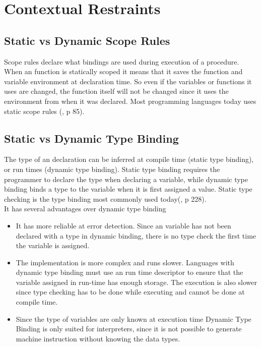 \section{Contextual Restraints}
\subsection{Static vs Dynamic Scope Rules}
Scope rules declare what bindings are used during execution of a procedure.
When an function is statically scoped it means that it saves the function and variable environment at declaration time. So even if the variables or functions it uses are changed, the function itself will not be changed since it uses the environment from when it was declared. Most programming languages today uses static scope rules (\cite{syntax-and-semantics}, p 85). 
\subsection{Static vs Dynamic Type Binding}
The type of an declaration can be inferred at compile time (static type binding), or run times (dynamic type binding). Static type binding requires the programmer to declare the type when declaring a variable, while dynamic type binding binds a type to the variable when it is first assigned a value. Static type checking is the type binding most commonly used today(\cite{conceptsOfProgrammingLanguages}, p 228). \\ 
It has several advantages over dynamic type binding
\begin{itemize}
    \item It has more reliable at error detection. Since an variable has not been declared with a type in dynamic binding, there is no type check the first time the variable is assigned.
    \item The implementation is more complex and runs slower. Languages with dynamic type binding must use an run time descriptor to ensure that the variable assigned in run-time has enough storage.
    The execution is also slower since type checking has to be done while executing and cannot be done at compile time.
    \item Since the type of variables are only known at execution time Dynamic Type Binding is only suited for interpreters, since it is not possible to generate machine instruction without knowing the data types.
\end{itemize}


